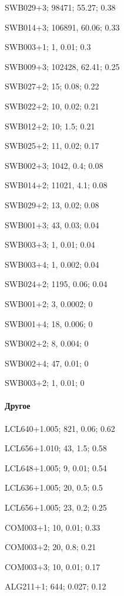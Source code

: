 SWB029+3; 98471; 55.27; 0.38

SWB014+3; 106891, 60.06; 0.33

SWB003+1; 1, 0.01; 0.3

SWB009+3; 102428, 62.41; 0.25

SWB027+2; 15; 0.08; 0.22

SWB022+2; 10, 0.02; 0.21

SWB012+2; 10; 1.5; 0.21

SWB025+2; 11, 0.02; 0.17

SWB002+3; 1042, 0.4; 0.08

SWB014+2; 11021, 4.1; 0.08

SWB029+2; 13, 0.02; 0.08

SWB001+3; 43, 0.03; 0.04

SWB003+3; 1, 0.01; 0.04

SWB003+4; 1, 0.002; 0.04

SWB024+2; 1195, 0.06; 0.04

SWB001+2; 3, 0.0002; 0

SWB001+4; 18, 0.006; 0

SWB002+2; 8, 0.004; 0

SWB002+4; 47, 0.01; 0

SWB003+2; 1, 0.01; 0




\paragraph{Другое}








LCL640+1.005; 821, 0.06; 0.62

LCL656+1.010; 43, 1.5; 0.58

LCL648+1.005; 9, 0.01; 0.54

LCL636+1.005; 20, 0.5; 0.5

LCL656+1.005; 23, 0.2; 0.25




COM003+1; 10, 0.01; 0.33

COM003+2; 20, 0.8; 0.21

COM003+3; 10, 0.01; 0.17

ALG211+1; 644; 0.027; 0.12

